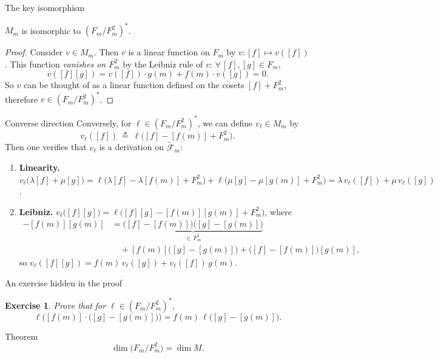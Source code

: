 \documentclass[10pt]{beamer}
\newtheorem{exercise}{Exercise}
\newcommand{\F}{\mathcal{F}}
\begin{document}
\begin{frame}{The key isomorphism}
	\begin{lemma}
		$M_m$ is isomorphic to $(F_m / F_m^2)^*$.
	\end{lemma}
	\begin{proof}
		Consider $v \in M_m$. Then $v$ is a linear function on $F_m$ by
		$v : [f] \mapsto v([f])$. This function \emph{vanishes on $F_m^2$}
		by the Leibniz rule of $v$: $\forall\, [f], [g] \in F_m$,
		\[
			v([f][g]) = v([f]) \cdot g(m) + f(m) \cdot v([g]) = 0.
		\]
		So $v$ can be thought of as a linear function defined on the
		cosets $[f] + F_m^2$, therefore $v \in (F_m/F_m^2)^*$.
	\end{proof}
\end{frame}

\begin{frame}{Converse direction}
	Conversely, for $\ell \in (F_m / F_m^2)^*$, we can define
	$v_\ell \in M_m$ by
	\[
		v_\ell([f]) \ \triangleq\
		\ell\bigl( [f] - [f(m)] + F_m^2 \bigr).
	\]
	Then one verifies that $v_\ell$ is a derivation on
	$\widetilde{\F}_m$:
	\begin{enumerate}
		\item \textbf{Linearity.}
		      $v_\ell\bigl(\lambda[f] + \mu[g]\bigr)
			      = \ell\bigl( \lambda[f] - \lambda[f(m)] + F_m^2 \bigr)
			      + \ell\bigl( \mu[g] - \mu[g(m)] + F_m^2 \bigr)
			      = \lambda\, v_\ell([f]) + \mu\, v_\ell([g])$.
		\item \textbf{Leibniz.}
		      $v_\ell\bigl([f][g]\bigr)
			      = \ell\bigl( [f][g] - [f(m)][g(m)] + F_m^2 \bigr)$,
		      where
		      \begin{align*}
			      [f][g] - [f(m)][g(m)]
			       & = \underbrace{\bigl([f]-[f(m)]\bigr)\bigl([g]-[g(m)]\bigr)}_{\in\, F_m^2} \\
			       & \quad + [f(m)]\bigl([g]-[g(m)]\bigr)
			      + \bigl([f]-[f(m)]\bigr)[g(m)],
		      \end{align*}
		      so $v_\ell([f][g]) = f(m)\, v_\ell([g]) + v_\ell([f])\, g(m)$.
	\end{enumerate}
\end{frame}

\begin{frame}{An exercise hidden in the proof}
	\begin{exercise}
		Prove that for $\ell \in (F_m / F_m^2)^*$,
		\[
			\ell\bigl( [f(m)]\cdot\bigl([g]-[g(m)]\bigr) \bigr)
			= f(m)\, \ell\bigl( [g] - [g(m)] \bigr).
		\]
	\end{exercise}
	\bigskip
	\begin{alertblock}{Theorem}
		\[
			\dim\bigl(F_m / F_m^2\bigr) = \dim M.
		\]
	\end{alertblock}
\end{frame}
\end{document}
